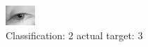 \begin{figure}[h!]
\begin{center}
\includegraphics[width=0.60\columnwidth]{figures/ID2863_class_2_target_3.png}
\end{center}
\caption{ Classification: 2 actual target: 3}
\label{fig:ID2863_class_2_target_3}
\end{figure}
